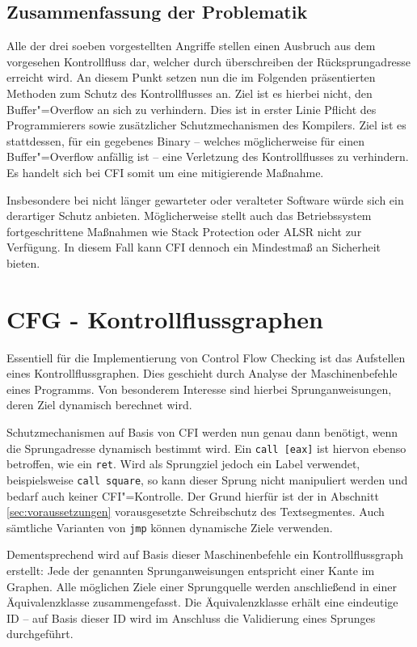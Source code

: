 \subsection{Zusammenfassung der Problematik}

Alle der drei soeben vorgestellten Angriffe stellen einen Ausbruch aus dem vorgesehen Kontrollfluss dar, welcher durch überschreiben der Rücksprungadresse erreicht wird. An diesem Punkt setzen nun die im Folgenden präsentierten Methoden zum Schutz des Kontrollflusses an. Ziel ist es hierbei nicht, den Buffer"=Overflow an sich zu verhindern. Dies ist in erster Linie Pflicht des Programmierers sowie zusätzlicher Schutzmechanismen des Kompilers. Ziel ist es stattdessen, für ein gegebenes Binary -- welches möglicherweise für einen Buffer"=Overflow anfällig ist -- eine Verletzung des Kontrollflusses zu verhindern. Es handelt sich bei CFI somit um eine mitigierende Maßnahme.


Insbesondere bei nicht länger gewarteter oder veralteter Software würde sich ein derartiger Schutz anbieten. Möglicherweise stellt auch das Betriebssystem fortgeschrittene Maßnahmen wie Stack Protection oder ALSR nicht zur Verfügung. In diesem Fall kann CFI dennoch ein Mindestmaß an Sicherheit bieten.


\section{CFG - Kontrollflussgraphen}

Essentiell für die Implementierung von Control Flow Checking ist das Aufstellen eines Kontrollflussgraphen. Dies geschieht durch Analyse der Maschinenbefehle eines Programms. Von besonderem Interesse sind hierbei Sprunganweisungen, deren Ziel dynamisch berechnet wird.

Schutzmechanismen auf Basis von CFI werden nun genau dann benötigt, wenn die Sprungadresse dynamisch bestimmt wird. Ein \texttt{call [eax]} ist hiervon ebenso betroffen, wie ein \texttt{ret}. Wird als Sprungziel jedoch ein Label verwendet, beispielsweise \texttt{call square}, so kann dieser Sprung nicht manipuliert werden und bedarf auch keiner CFI"=Kontrolle. Der Grund hierfür ist der in Abschnitt \ref{sec:voraussetzungen} vorausgesetzte Schreibschutz des Textsegmentes. Auch sämtliche Varianten von \texttt{jmp} können dynamische Ziele verwenden.

Dementsprechend wird auf Basis dieser Maschinenbefehle ein Kontrollflussgraph erstellt: Jede der genannten Sprunganweisungen entspricht einer Kante im Graphen. Alle möglichen Ziele einer Sprungquelle werden anschließend in einer Äquivalenzklasse zusammengefasst. Die Äquivalenzklasse erhält eine eindeutige ID -- auf Basis dieser ID wird im Anschluss die Validierung eines Sprunges durchgeführt.


